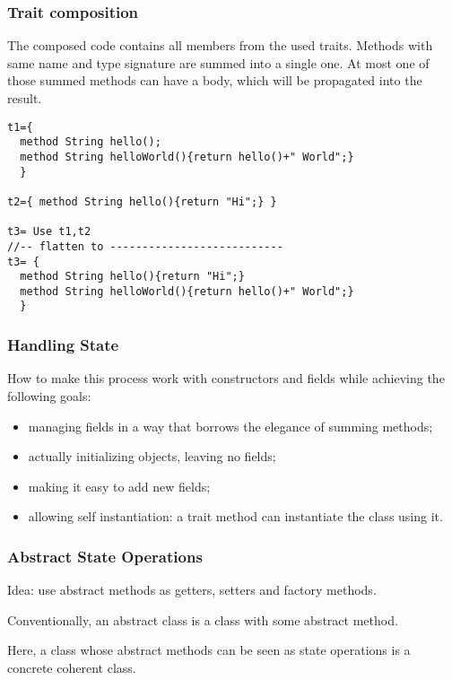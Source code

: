 \begin{frame}[fragile]
\frametitle{Trait composition}
The composed code contains all members from the used traits.
Methods with same name and type signature are summed into a single one.
At most one of those summed methods
can have a body, which will be propagated into the result.

\begin{lstlisting}
t1={
  method String hello();
  method String helloWorld(){return hello()+" World";}
  }

t2={ method String hello(){return "Hi";} }

t3= Use t1,t2
//-- flatten to ---------------------------
t3= {
  method String hello(){return "Hi";}
  method String helloWorld(){return hello()+" World";}
  }
\end{lstlisting}
\end{frame}

\begin{frame}[fragile]
\frametitle{Handling State}
How to make this process work with constructors and fields
while achieving the following goals:
\begin{itemize}
\item managing fields in a way that borrows the elegance of summing methods;
\item actually initializing objects, leaving no \Q@null@ fields;
\item making it easy to add new fields;
\item allowing self instantiation: a trait method can instantiate the class using it.
\end{itemize}

\end{frame}

\begin{frame}[fragile]
\frametitle{Abstract State Operations}
Idea: use abstract methods as getters, setters and factory methods.

Conventionally, an abstract class is a class with some abstract method.

Here, a class whose abstract methods can be seen as state operations is a
concrete coherent class.

\end{frame}

